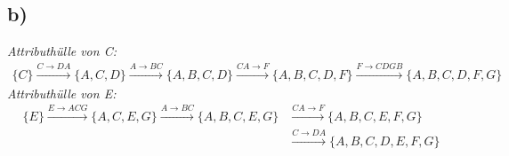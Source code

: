 \subsection*{b)}
\emph{Attributhülle von C:}\\
\begin{align*}  
  \{C\} \overset{C \rightarrow DA}{\rightarrow } \{A,C,D\} \overset{A \rightarrow BC}{\rightarrow } \{A,B,C,D\} \overset{CA \rightarrow F}{\rightarrow } \{A,B,C,D,F\} \overset{F \rightarrow CDGB}{\rightarrow } \{A,B,C,D,F,G\}
\end{align*}
\emph{Attributhülle von E:}\\
\begin{align*}
  \{E\} \overset{E \rightarrow ACG}{\rightarrow } \{A,C,E,G\} \overset{A \rightarrow BC}{\rightarrow } \{A,B,C,E,G\} &\overset{CA \rightarrow F}{\rightarrow } \{A,B,C,E,F,G\} \\
  &\overset{C \rightarrow DA}{\rightarrow } \{A,B,C,D,E,F,G\}
\end{align*}
